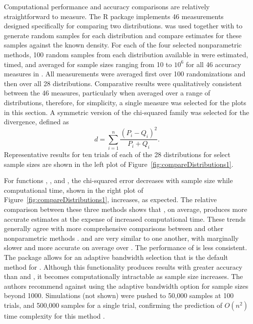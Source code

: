 Computational performance and accuracy comparisons are relatively straightforward to measure.  The R package  \citep{philentropy} implements 46 measurements designed specifically for comparing two distributions.   was used together with  to generate random samples for each distribution and compare estimates for these samples against the known density.  For each of the four selected nonparametric methods, 100 random samples from each distribution available in  were estimated, timed, and averaged for sample sizes ranging from 10 to $10^6$ for all 46 accuracy measures in . All measurements were averaged first over 100 randomizations and then over all 28 distributions. 
Comparative results were qualitatively consistent between the 46 measures, particularly when averaged over a range of distributions, therefore, for simplicity, a single measure was selected for the plots in this section. A symmetric version of the chi-squared family was selected for the divergence, defined as 
\begin{equation} \label{eq:chi}
d=\sum_{i=1}^{n}\frac{\left(P_i - Q_i\right)^2}{P_i + Q_i}.
\end{equation}
Representative results for ten trials of each of the 28 distributions for select sample sizes are shown in the left plot of Figure~\ref{fig:compareDistributions1}. 

For functions , , and , the chi-squared error decreases with sample size while computational time, shown in the right plot of Figure~\ref{fig:compareDistributions1}, increases, as expected.  The relative comparison between these three methods shows that , on average, produces more accurate estimates at the expense of increased computational time. These trends generally agree with more comprehensive comparisons between  and other nonparametric methods \citep{kdeR6}.  and  are very similar to one another, with  marginally slower and more accurate on average over . The performance of  is less consistent.  The  package allows for an adaptive bandwidth selection that is the default method for .  Although this functionality produces results with greater accuracy than  and , it becomes computationally intractable as sample size increases.  The authors recommend against using the adaptive bandwidth option for sample sizes beyond 1000.  Simulations (not shown) were pushed to 50,000 samples at 100 trials, and 500,000 samples for a single trial, confirming the prediction of $O(n^2)$ time complexity for this method \citep{kdeR2}.

